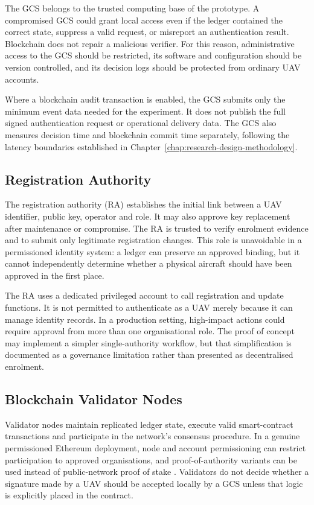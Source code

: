 The GCS belongs to the trusted computing base of the prototype. A compromised GCS could grant local access even if the ledger contained the correct state, suppress a valid request, or misreport an authentication result. Blockchain does not repair a malicious verifier. For this reason, administrative access to the GCS should be restricted, its software and configuration should be version controlled, and its decision logs should be protected from ordinary UAV accounts.

Where a blockchain audit transaction is enabled, the GCS submits only the minimum event data needed for the experiment. It does not publish the full signed authentication request or operational delivery data. The GCS also measures decision time and blockchain commit time separately, following the latency boundaries established in Chapter~\ref{chap:research-design-methodology}.

\subsection{Registration Authority}
\label{subsec:registration-authority}

The registration authority (RA) establishes the initial link between a UAV identifier, public key, operator and role. It may also approve key replacement after maintenance or compromise. The RA is trusted to verify enrolment evidence and to submit only legitimate registration changes. This role is unavoidable in a permissioned identity system: a ledger can preserve an approved binding, but it cannot independently determine whether a physical aircraft should have been approved in the first place.

The RA uses a dedicated privileged account to call registration and update functions. It is not permitted to authenticate as a UAV merely because it can manage identity records. In a production setting, high-impact actions could require approval from more than one organisational role. The proof of concept may implement a simpler single-authority workflow, but that simplification is documented as a governance limitation rather than presented as decentralised enrolment.

\subsection{Blockchain Validator Nodes}
\label{subsec:validator-nodes}

Validator nodes maintain replicated ledger state, execute valid smart-contract transactions and participate in the network's consensus procedure. In a genuine permissioned Ethereum deployment, node and account permissioning can restrict participation to approved organisations, and proof-of-authority variants can be used instead of public-network proof of stake \cite{BesuPrivateNetworks2026,BesuPermissioning2026}. Validators do not decide whether a signature made by a UAV should be accepted locally by a GCS unless that logic is explicitly placed in the contract.

